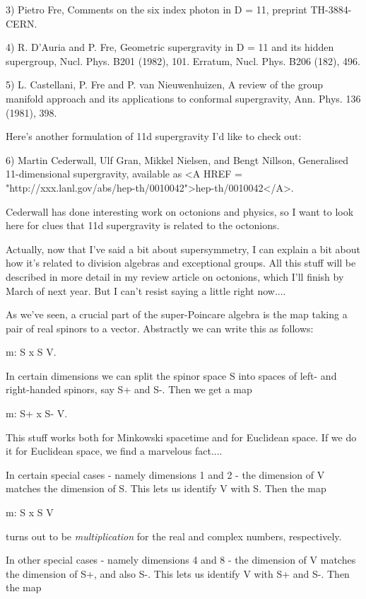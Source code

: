 3) Pietro Fre, Comments on the six index photon in D = 11, preprint
TH-3884-CERN.

4) R. D'Auria and P. Fre, Geometric supergravity in D = 11 and its hidden
supergroup, Nucl. Phys. B201 (1982), 101.  Erratum, Nucl. Phys. B206 (182),
496.

5) L. Castellani, P. Fre and P. van Nieuwenhuizen, A review of the group 
manifold approach and its applications to conformal supergravity, Ann.
Phys. 136 (1981), 398.

Here's another formulation of 11d supergravity I'd like to check out:

6) Martin Cederwall, Ulf Gran, Mikkel Nielsen, and Bengt Nillson,
Generalised 11-dimensional supergravity,  available as <A HREF =
"http://xxx.lanl.gov/abs/hep-th/0010042">hep-th/0010042</A>.

Cederwall has done interesting work on octonions and physics, so I want
to look here for clues that 11d supergravity is related to the octonions.

Actually, now that I've said a bit about supersymmetry, I can explain a
bit about how it's related to division algebras and exceptional groups.
All this stuff will be described in more detail in my review article on
octonions, which I'll finish by March of next year.  But I can't resist
saying a little right now....

As we've seen, a crucial part of the super-Poincare algebra is the map 
taking a pair of real spinors to a vector.  Abstractly we can write 
this as follows:

m: S x S \to  V.

In certain dimensions we can split the spinor space S into spaces of
left- and right-handed spinors, say S+ and S-.  Then we get a map

m: S+ x S- \to  V.

This stuff works both for Minkowski spacetime and for Euclidean space.  
If we do it for Euclidean space, we find a marvelous fact....

In certain special cases - namely dimensions 1 and 2 - the dimension of
V matches the dimension of S.  This lets us identify V with S.  Then the
map 

m: S x S \to  V

turns out to be \emph{multiplication} for the real and complex numbers,
respectively.

In other special cases - namely dimensions 4 and 8 - the dimension of V
matches the dimension of S+, and also S-.  This lets us identify V with
S+ and S-.  Then the map 

